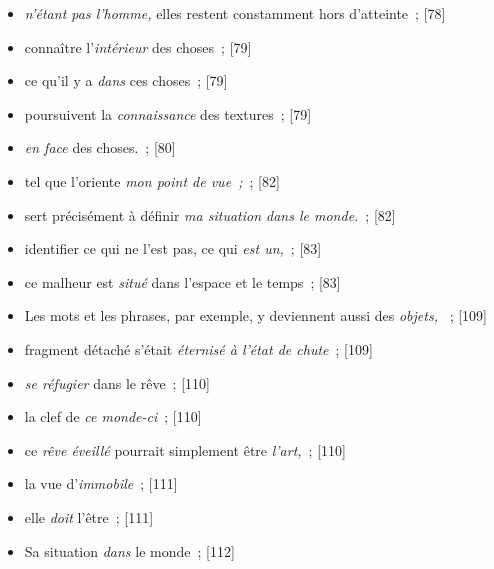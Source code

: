 \documentclass[12pt, a4paper]{article}
\begin{document}
\begin{itemize}
	\item \textit{n’étant pas l’homme,} elles restent constamment hors d’atteinte{\color{gray}~; [78]}

	\item connaître l’\textit{intérieur} des choses{\color{gray}~; [79]}

	\item ce qu’il y a \textit{dans} ces choses{\color{gray}~; [79]}

	\item  poursuivent la \textit{connaissance} des textures{\color{gray}~; [79]}

	\item \textit{en face} des choses.{\color{gray}~; [80]}

	\item tel que l’oriente \textit{mon point de vue~;}{\color{gray}~; [82]}

	\item sert précisément à définir \textit{ma situation dans le monde.}{\color{gray}~; [82]}

	\item identifier ce qui ne l’est pas, ce qui \textit{est un,}{\color{gray}~; [83]}

	\item ce malheur est \textit{situé} dans l’espace et le temps{\color{gray}~; [83]}

	\item Les mots et les phrases, par exemple, y deviennent aussi des \textit{objets, }{\color{gray}~; [109]}

	\item fragment détaché s’était \textit{éternisé à l’état de chute}{\color{gray}~; [109]}

	\item \textit{se réfugier} dans le rêve{\color{gray}~; [110]}

	\item la clef de \textit{ce monde-ci}{\color{gray}~; [110]}

	\item ce \textit{rêve éveillé} pourrait simplement être \textit{l’art,}{\color{gray}~; [110]}

	\item la vue d’\textit{immobile}{\color{gray}~; [111]}

	\item elle \textit{doit} l’être{\color{gray}~; [111]}

	\item Sa situation \textit{dans} le monde{\color{gray}~; [112]}


\end{itemize}
\end{document}
